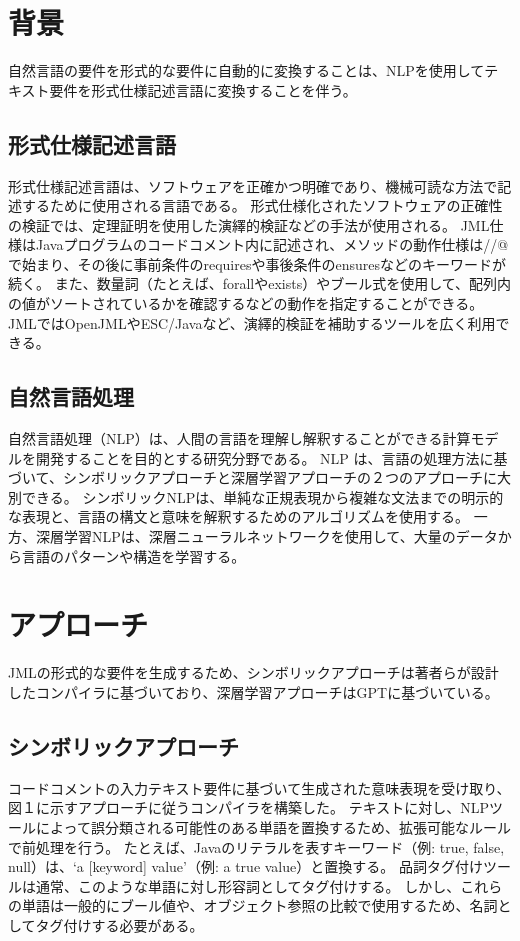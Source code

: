 \documentclass[uplatex, twocolumn,10pt]{jsarticle} %
\begin{document}
\section{背景}
\label{sec:background}
自然言語の要件を形式的な要件に自動的に変換することは、NLPを使用してテキスト要件を形式仕様記述言語に変換することを伴う。

\subsection{形式仕様記述言語}
形式仕様記述言語は、ソフトウェアを正確かつ明確であり、機械可読な方法で記述するために使用される言語である。
形式仕様化されたソフトウェアの正確性の検証では、定理証明を使用した演繹的検証などの手法が使用される。
JML仕様はJavaプログラムのコードコメント内に記述され、メソッドの動作仕様は//@で始まり、その後に事前条件のrequiresや事後条件のensuresなどのキーワードが続く。
また、数量詞（たとえば、forallやexists）やブール式を使用して、配列内の値がソートされているかを確認するなどの動作を指定することができる。
JMLではOpenJML\cite{4}やESC/Java\cite{6}など、演繹的検証を補助するツールを広く利用できる。

\subsection{自然言語処理}
自然言語処理（NLP）は、人間の言語を理解し解釈することができる計算モデルを開発することを目的とする研究分野である。
NLP は、言語の処理方法に基づいて、シンボリックアプローチと深層学習アプローチの２つのアプローチに大別できる。
シンボリックNLPは、単純な正規表現から複雑な文法までの明示的な表現と、言語の構文と意味を解釈するためのアルゴリズムを使用する\cite{3}。
一方、深層学習NLPは、深層ニューラルネットワークを使用して、大量のデータから言語のパターンや構造を学習する\cite{2}。

\section{アプローチ}
\label{sec:approaches}
JMLの形式的な要件を生成するため、シンボリックアプローチは著者らが設計したコンパイラに基づいており、深層学習アプローチはGPTに基づいている。

\subsection{シンボリックアプローチ}
コードコメントの入力テキスト要件に基づいて生成された意味表現を受け取り、図１に示すアプローチに従うコンパイラを構築した。
テキストに対し、NLPツールによって誤分類される可能性のある単語を置換するため、拡張可能なルールで前処理を行う。
たとえば、Javaのリテラルを表すキーワード（例: true, false, null）は、‘a [keyword] value'（例: a true value）と置換する。
品詞タグ付けツールは通常、このような単語に対し形容詞としてタグ付けする。
しかし、これらの単語は一般的にブール値や、オブジェクト参照の比較で使用するため、名詞としてタグ付けする必要がある。
\end{document}
